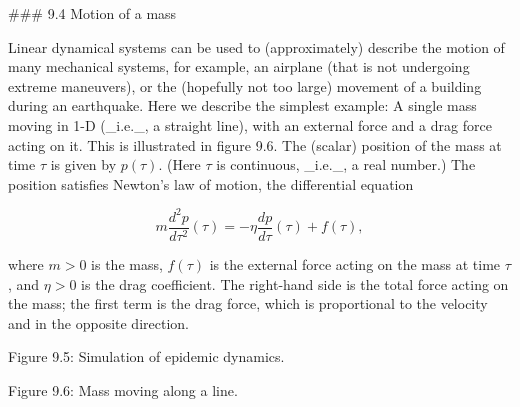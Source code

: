 

### 9.4 Motion of a mass

Linear dynamical systems can be used to (approximately) describe the motion of many mechanical systems, for example, an airplane (that is not undergoing extreme maneuvers), or the (hopefully not too large) movement of a building during an earthquake. Here we describe the simplest example: A single mass moving in 1-D (_i.e._, a straight line), with an external force and a drag force acting on it. This is illustrated in figure 9.6. The (scalar) position of the mass at time \(\tau\) is given by \(p(\tau)\). (Here \(\tau\) is continuous, _i.e._, a real number.) The position satisfies Newton's law of motion, the differential equation

\[m\frac{d^{2}p}{d\tau^{2}}(\tau)=-\eta\frac{dp}{d\tau}(\tau)+f(\tau),\]

where \(m>0\) is the mass, \(f(\tau)\) is the external force acting on the mass at time \(\tau\), and \(\eta>0\) is the drag coefficient. The right-hand side is the total force acting on the mass; the first term is the drag force, which is proportional to the velocity and in the opposite direction.

Figure 9.5: Simulation of epidemic dynamics.

Figure 9.6: Mass moving along a line.

